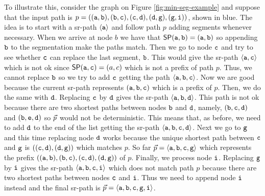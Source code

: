 To illustrate this, consider the graph on Figure \ref{fig:min-seg-example} and
suppose that the input path is $p = ((\texttt{a}, \texttt{b}), (\texttt{b}, \texttt{c}), (\texttt{c}, \texttt{d}), (\texttt{d}, \texttt{g}), (\texttt{g}, \texttt{i}))$, shown in blue. 
The idea is to start with a sr-path $\langle \texttt{a} \rangle$
and follow path $p$ adding segments whenever necessary. When we arrive at node $b$ we have that $\mathsf{SP}(\texttt{a}, \texttt{b}) = (\texttt{a}, \texttt{b})$ so appending
$\texttt{b}$ to the segmentation make the paths match. Then we go to node $\texttt{c}$ and try to see whether $\texttt{c}$ can replace the last segment, $\texttt{b}$. 
This would give the sr-path $\langle \texttt{a}, \texttt{c} \rangle$ which is not ok since $\mathsf{SP}(\texttt{a}, \texttt{c}) = (a, c)$ which is not a prefix of path $p$. Thus, 
we cannot replace $\texttt{b}$ so we try to add $\texttt{c}$ getting the path $\langle \texttt{a}, \texttt{b}, \texttt{c} \rangle$. 
Now we are good because the current sr-path represents $(\texttt{a}, \texttt{b}, \texttt{c})$ which is a prefix of $p$. Then, we do the same with $\texttt{d}$.
Replacing $\texttt{c}$ by $\texttt{d}$ gives
the sr-path $\langle \texttt{a}, \texttt{b}, \texttt{d} \rangle$. This path is not ok because there are two shortest paths between nodes $\texttt{b}$ and $\texttt{d}$, namely,
$(\texttt{b}, \texttt{c}, \texttt{d})$ and $(\texttt{b}, \texttt{e}, \texttt{d})$ so $\vec{p}$ would not be deterministic. This means that, as before, we need to add $\texttt{d}$ to the end of the list getting
the sr-path $\langle \texttt{a}, \texttt{b}, \texttt{c}, \texttt{d} \rangle$. Next we go to $\texttt{g}$ and this time replacing node $\texttt{d}$ works because 
the unique shortest path between $\texttt{c}$ and $\texttt{g}$ is $((\texttt{c}, \texttt{d}), (\texttt{d}, \texttt{g}))$ which matches $p$. So far 
$\vec{p} = \langle \texttt{a}, \texttt{b}, \texttt{c}, \texttt{g} \rangle$ which represents the prefix  
$((\texttt{a}, \texttt{b}), (\texttt{b}, \texttt{c}), (\texttt{c}, \texttt{d}), (\texttt{d}, \texttt{g}))$ of $p$.
Finally, we process node $\texttt{i}$. Replacing $\texttt{g}$ by $\texttt{i}$ gives the sr-path $\langle \texttt{a}, \texttt{b}, \texttt{c}, \texttt{i} \rangle$ which does not match path $p$ because
there are two shortest paths between nodes $\texttt{c}$ and $\texttt{i}$. Thus we need to append node $\texttt{i}$ instead and the final sr-path
is $\vec{p} = \langle \texttt{a}, \texttt{b}, \texttt{c}, \texttt{g}, \texttt{i} \rangle$.

